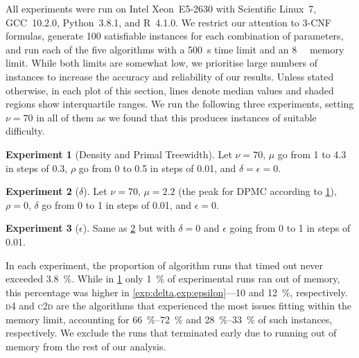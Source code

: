 \documentclass{article}
\theoremstyle{definition}
\newtheorem{experiment}{Experiment}
\theoremstyle{remark}
\begin{document}
All experiments were run on Intel Xeon~E5-2630 with Scientific Linux~7,
GCC~10.2.0, Python~3.8.1, and R~4.1.0. We restrict our attention to 3-CNF
formulas, generate 100 satisfiable instances for each combination of parameters,
and run each of the five algorithms with a \SI{500}{\second} time limit and an
\SI{8}{\gibi\byte} memory limit. While both limits are somewhat low, we
prioritise large numbers of instances to increase the accuracy and reliability
of our results. Unless stated otherwise, in each plot of this section, lines
denote median values and shaded regions show interquartile ranges. We run the
following three experiments, setting $\nu = 70$ in all of them as we found that
this produces instances of suitable difficulty.

\begin{experiment}[Density and Primal Treewidth] \label{exp:density}
  Let $\nu = 70$, $\mu$ go from 1 to 4.3 in steps of 0.3, $\rho$ go from 0 to
  0.5 in steps of 0.01, and $\delta = \epsilon = 0$.
\end{experiment}

\begin{experiment}[$\delta$] \label{exp:delta}
  Let $\nu = 70$, $\mu = 2.2$ (the peak for \textsc{DPMC}
  \cite{DBLP:conf/cp/DudekPV20} according to \cref{exp:density}), $\rho = 0$,
  $\delta$ go from 0 to 1 in steps of 0.01, and $\epsilon = 0$.
\end{experiment}

\begin{experiment}[$\epsilon$] \label{exp:epsilon}
  Same as \cref{exp:delta} but with $\delta = 0$ and $\epsilon$ going from 0 to
  1 in steps of 0.01.
\end{experiment}

In each experiment, the proportion of algorithm runs that timed out never
exceeded \SI{3.8}{\percent}. While in \cref{exp:density} only \SI{1}{\percent}
of experimental runs ran out of memory, this percentage was higher in
\cref{exp:delta,exp:epsilon}---10 and \SI{12}{\percent}, respectively.
\textsc{d4} \cite{DBLP:conf/ijcai/LagniezM17} and \textsc{c2d}
\cite{DBLP:conf/ecai/Darwiche04} are the algorithms that experienced the most
issues fitting within the memory limit, accounting for
\SIrange{66}{72}{\percent} and \SIrange{28}{33}{\percent} of such instances,
respectively. We exclude the runs that terminated early due to running out of
memory from the rest of our analysis.
\end{document}
